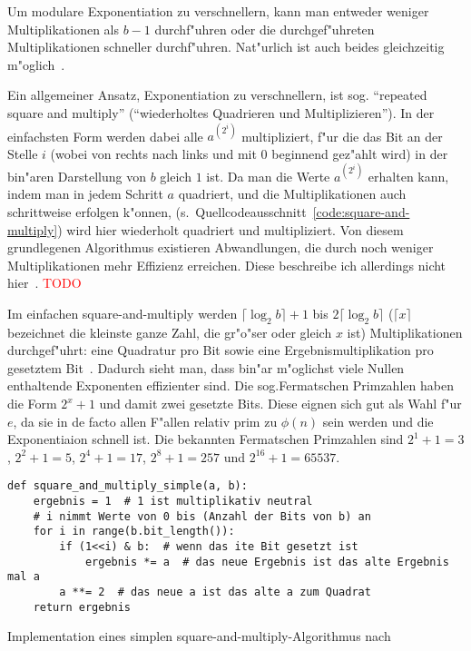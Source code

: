 \documentclass[12pt]{article}
\newcommand{\todo}[1]{\textcolor{red}{\mbox{TODO}}\marginpar{\textcolor{red}{#1}}}
\begin{document}
Um modulare Exponentiation zu verschnellern, kann man entweder weniger Multiplikationen
als $b-1$ durchf"uhren oder die durchgef"uhreten Multiplikationen schneller durchf"uhren.
Nat"urlich ist auch beides gleichzeitig m"oglich~\cite{hac}.

Ein allgemeiner Ansatz, Exponentiation zu verschnellern, ist sog.\@
"`repeated square and multiply"' ("`wiederholtes Quadrieren und Multiplizieren"').
In der einfachsten Form werden dabei alle $a^{(2^i)}$ multipliziert,
f"ur die das Bit an der Stelle $i$ (wobei von rechts nach links und mit 0 beginnend gez"ahlt wird)
in der bin"aren Darstellung von $b$ gleich $1$ ist.
Da man die Werte $a^{(2^i)}$ erhalten kann, indem man in jedem Schritt $a$ quadriert,
und die Multiplikationen auch schrittweise erfolgen k"onnen, (s.~Quellcodeausschnitt~\ref{code:square-and-multiply})
wird hier wiederholt quadriert und multipliziert.
Von diesem grundlegenen Algorithmus existieren Abwandlungen,
die durch noch weniger Multiplikationen mehr Effizienz erreichen.
Diese beschreibe ich allerdings nicht hier~\cite{hac}. \todo{Anhang?}

Im einfachen square-and-multiply werden $\lceil \log_2 b \rceil + 1$ bis $2 \lceil \log_2 b \rceil$
($\lceil x \rceil$ bezeichnet die kleinste ganze Zahl, die gr"o"ser oder gleich $x$ ist)
Multiplikationen durchgef"uhrt: eine Quadratur pro Bit sowie eine Ergebnismultiplikation pro ge\-setz\-tem Bit~\cite{hac}.
Dadurch sieht man, dass bin"ar m"oglichst viele Nullen enthaltende Exponenten effizienter sind.
Die sog.\@ Fermatschen Primzahlen haben die Form $2^x + 1$ und damit zwei gesetzte Bits.
Diese eignen sich gut als Wahl f"ur $e$, da sie in de facto allen F"allen relativ prim zu
$\phi(n)$ sein werden und die Exponentiaion schnell ist.
Die bekannten Fermatschen Primzahlen sind $2^1 + 1 = 3$, $2^2+1 = 5$, $2^4 + 1 = 17$, $2^8+1 = 257$ und $2^{16} + 1 = 65537$.

\begin{code-snip}
\begin{lstlisting}
def square_and_multiply_simple(a, b):
    ergebnis = 1  # 1 ist multiplikativ neutral
    # i nimmt Werte von 0 bis (Anzahl der Bits von b) an
    for i in range(b.bit_length()):
        if (1<<i) & b:  # wenn das ite Bit gesetzt ist
            ergebnis *= a  # das neue Ergebnis ist das alte Ergebnis mal a
        a **= 2  # das neue a ist das alte a zum Quadrat
    return ergebnis
\end{lstlisting}
\caption{Implementation eines simplen square-and-multiply-Algorithmus nach~\cite{hac}}
\label{code:square-and-multiply}
\end{code-snip}
\end{document}
